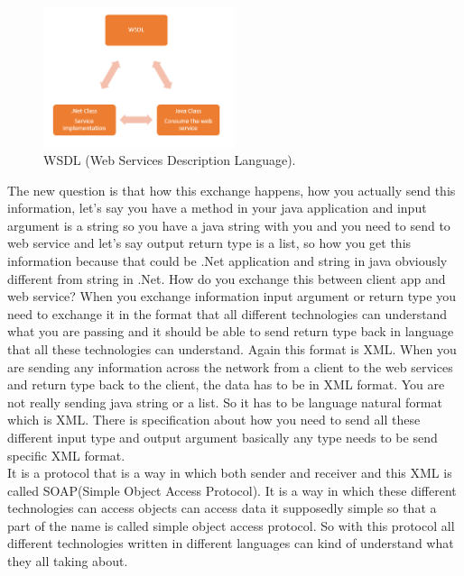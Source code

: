 \begin{figure}[!htb]
  \centering
  \includegraphics[width=0.5\textwidth]{Figures/WSDL.png}
  \caption[WSDL (Web Services Description Language).]{WSDL (Web Services Description Language).}
  \label{fig:wsdl}
\end{figure}

The new question is that how this exchange happens, how you actually send this information, let’s say you have a method in
your java application and input argument is a string so you have a java string with you and you need to send to web service
and let’s say output return type is a list, so how you get this information because that could be .Net application and string
in java obviously different from string in .Net. How do you exchange this between client app and web service?  When you exchange
information input argument or return type you need to exchange it in the format that all different technologies can understand
what you are passing and it should be able to send return type back in language that all these technologies can understand.
Again this format is XML. When you are sending any information across the network from a client to the web services and
return type back to the client, the data has to be in XML format. You are not really sending java string or a list. So it
has to be language natural format which is XML. There is specification about how you need to send all these different input
type and output argument basically any type needs to be send specific XML format.\\

It is a protocol that is a way in which both sender and receiver and this XML is called SOAP(Simple Object Access Protocol).
It is a way in which these different technologies can access objects can access data it supposedly simple so that a part
of the name is called simple object access protocol. So with this protocol all different technologies written in different
languages can kind of understand what they all taking about.\\

